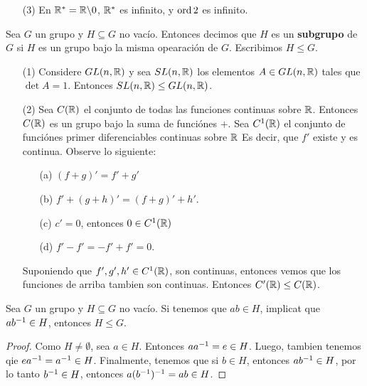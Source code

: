 \begin{example}
\begin{enumerate}
         \item[(3)] En $\mathbb{R}^*=\mathbb{R}\backslash0$, $\mathbb{R}^*$ es infinito, y  $\operatorname{ord}{2}$ es
             infinito.
    \end{enumerate}
\end{example}

\begin{definition}
    Sea $G$ un grupo y  $H \subseteq G$ no vac\'io. Entonces decimos que  $H$ es
    un  \textbf{subgrupo} de $G$ si  $H$ es un grupo bajo la misma opearaci\'on
    de  $G$. Escribimos  $H \leq G$.
\end{definition}

\begin{example}\label{example_3}
    \begin{enumerate}
        \item[(1)] Considere $GL(n,\mathbb{R})$ y sea $SL(n,\mathbb{R})$ los elementos $A \in
           GL(n,\mathbb{R})$ tales que $\det{A}=1$. Entonces $SL(n,\mathbb{R}) \leq GL(n,\mathbb{R})$.

       \item[(2)] Sea $C(\mathbb{R})$ el conjunto de todas las funciones continuas sobre
           $\mathbb{R}$. Entonces  $C(\mathbb{R})$ es un grupo bajo la suma de funci\'ones $+$.
           Sea $C^1(\mathbb{R})$ el conjunto de funci\'ones primer diferenciables
           continuas sobre $\mathbb{R}$ Es decir, que $f'$ existe y es continua.
           Observe lo siguiente:
           \begin{enumerate}
               \item[(a)] $(f+g)'=f'+g'$
               \item[(b)] $f'+(g+h)'=(f+g)'+h'$.
               \item[(c)] $c'=0$, entonces $0 \in C^1(\mathbb{R})$
               \item[(d)] $f'-f'=-f'+f'=0$.
           \end{enumerate}
           Suponiendo que $f',g',h' \in C^1(\mathbb{R})$, son continuas, entonces vemos
           que los funciones de arriba tambien son continuas. Entonces $C'(\mathbb{R})
           \leq C(\mathbb{R})$.
    \end{enumerate}
\end{example}

\begin{lemma}\label{lemma_1}
    Sea $G$ un grupo y  $H \subseteq G$ no vac\'io. Si tenemos que $ab \in H$,
    implicat que $ab^{-1} \in H$, entonces $H \leq G$.
\end{lemma}
\begin{proof}
    Como $H \neq \emptyset$, sea  $a \in H$. Entonces $aa^{-1}=e \in H$. Luego,
    tambien tenemos qie $ea^{-1}=a^{-1} \in H$. Finalmente, tenemos que si $b
    \in H$, entonces  $ab^{-1} \in H$, por lo tanto $b^{-1} \in H$, entonces
    $a(b^{-1})^{-1}=ab \in H$.
\end{proof}

